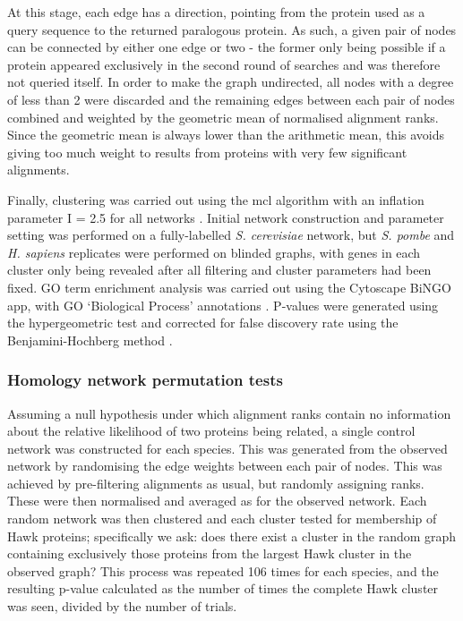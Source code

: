 \documentclass[a4paper,11pt,twoside,openright]{scrbook}
\begin{document}
At this stage, each edge has a direction, pointing from the protein used as a query sequence to the returned paralogous protein. As such, a given pair of nodes can be connected by either one edge or two - the former only being possible if a protein appeared exclusively in the second round of searches and was therefore not queried itself. In order to make the graph undirected, all nodes with a degree of less than 2 were discarded and the remaining edges between each pair of nodes combined and weighted by the geometric mean of normalised alignment ranks. Since the geometric mean is always lower than the arithmetic mean, this avoids giving too much weight to results from proteins with very few significant alignments.

Finally, clustering was carried out using the mcl algorithm with an inflation parameter I = 2.5 for all networks \cite{VanDongen2000}. Initial network construction and parameter setting was performed on a fully-labelled \textit{S. cerevisiae} network, but \textit{S. pombe} and \textit{H. sapiens} replicates were performed on blinded graphs, with genes in each cluster only being revealed after all filtering and cluster parameters had been fixed. GO term enrichment analysis was carried out using the Cytoscape BiNGO app, with GO `Biological Process' annotations \cite{Maere2005}. P-values were generated using the hypergeometric test and corrected for false discovery rate using the Benjamini-Hochberg method \cite{Benjamini1995,Maere2005}.

\subsubsection{Homology network permutation tests}
Assuming a null hypothesis under which alignment ranks contain no information about the relative likelihood of two proteins being related, a single control network was constructed for each species. This was generated from the observed network by randomising the edge weights between each pair of nodes. This was achieved by pre-filtering alignments as usual, but randomly assigning ranks. These were then normalised and averaged as for the observed network. Each random network was then clustered and each cluster tested for membership of Hawk proteins; specifically we ask: does there exist a cluster in the random graph containing exclusively those proteins from the largest Hawk cluster in the observed graph? This process was repeated 106 times for each species, and the resulting p-value calculated as the number of times the complete Hawk cluster was seen, divided by the number of trials.
\end{document}
